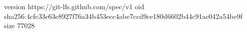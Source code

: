 version https://git-lfs.github.com/spec/v1
oid sha256:4cfc33c63e8927f76a34b453ecc4abe7ccd9ce180d6602b44c91ac042a54be9f
size 77028
